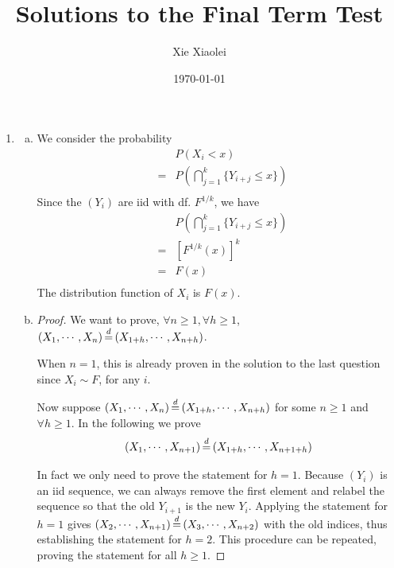 \documentclass{report}
\author{Xie Xiaolei}
\date{\today}
\title{Solutions to the Final Term Test}
\begin{document}
\maketitle

\begin{enumerate}[1.]
\item
  \begin{enumerate}[(a)]
  \item We consider the probability
    \begin{eqnarray*}
      && P(X_i < x) \\
      &=& P(\bigcap_{j=1}^k \{Y_{i+j} \le x\}) \\
    \end{eqnarray*}
    Since the $(Y_i)$ are iid with df. $F^{1/k}$, we have
    \begin{eqnarray*}
      && P(\bigcap_{j=1}^k \{Y_{i+j} \le x\}) \\
      &=& [F^{1/k}(x)]^k \\
      &=& F(x) \\
    \end{eqnarray*}
    The distribution function of $X_i$ is $F(x)$.

  \item 
    \begin{proof}
      We want to prove, $\forall n \ge 1, \forall h \ge 1$, $(X_1,
      \cdots, X_n) \ed (X_{1+h}, \cdots, X_{n+h})$.

      When $n = 1$, this is already proven in the solution to the last
      question since $X_i \sim F$, for any $i$.

      Now suppose $(X_1, \cdots, X_n) \ed (X_{1+h}, \cdots, X_{n+h})$
      for some $n \ge 1$ and $\forall h \ge 1$. In the following we
      prove 
      \[
      (X_1, \cdots, X_{n+1}) \ed (X_{1+h}, \cdots, X_{n+1+h})
      \]
      
      In fact we only need to prove the statement for $h=1$. Because
      $(Y_i)$ is an iid sequence, we can always remove the first element
      and relabel the sequence so that the old $Y_{i+1}$ is the new
      $Y_{i}$. Applying the statement for $h=1$ gives $(X_2, \cdots,
      X_{n+1}) \ed (X_{3}, \cdots, X_{n+2})$ with the old indices,
      thus establishing the statement for $h=2$. This procedure can be
      repeated, proving the statement for all $h \geq 1$.


\end{proof}
\end{enumerate}
\end{enumerate}
\end{document}
